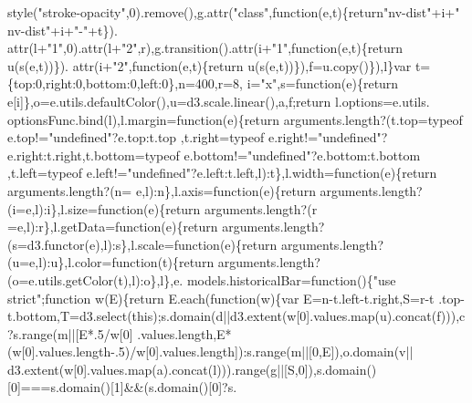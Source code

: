 \begin{DoxyCode}
      style(\textcolor{stringliteral}{"stroke-opacity"},0).remove(),g.attr(\textcolor{stringliteral}{"class"},\textcolor{keyword}{function}(e,t)\{\textcolor{keywordflow}{return}\textcolor{stringliteral}{"nv-dist"}+i+\textcolor{stringliteral}{" nv-dist"}+i+\textcolor{stringliteral}{"-"}+t\}).
      attr(l+\textcolor{stringliteral}{"1"},0).attr(l+\textcolor{stringliteral}{"2"},r),g.transition().attr(i+\textcolor{stringliteral}{"1"},\textcolor{keyword}{function}(e,t)\{\textcolor{keywordflow}{return} u(s(e,t))\}).
      attr(i+\textcolor{stringliteral}{"2"},\textcolor{keyword}{function}(e,t)\{\textcolor{keywordflow}{return} u(s(e,t))\}),f=u.copy()\}),l\}var t=\{top:0,right:0,bottom:0,left:0\},n=400,r=8,
      i=\textcolor{stringliteral}{"x"},s=\textcolor{keyword}{function}(e)\{\textcolor{keywordflow}{return} e[i]\},o=e.utils.defaultColor(),u=d3.scale.linear(),a,f;\textcolor{keywordflow}{return} l.options=e.utils.
      optionsFunc.bind(l),l.margin=\textcolor{keyword}{function}(e)\{\textcolor{keywordflow}{return} arguments.length?(t.top=typeof e.top!=\textcolor{stringliteral}{"undefined"}?e.top:t.top
      ,t.right=typeof e.right!=\textcolor{stringliteral}{"undefined"}?e.right:t.right,t.bottom=typeof e.bottom!=\textcolor{stringliteral}{"undefined"}?e.bottom:t.bottom
      ,t.left=typeof e.left!=\textcolor{stringliteral}{"undefined"}?e.left:t.left,l):t\},l.width=\textcolor{keyword}{function}(e)\{\textcolor{keywordflow}{return} arguments.length?(n=
      e,l):n\},l.axis=\textcolor{keyword}{function}(e)\{\textcolor{keywordflow}{return} arguments.length?(i=e,l):i\},l.size=\textcolor{keyword}{function}(e)\{\textcolor{keywordflow}{return} arguments.length?(r
      =e,l):r\},l.getData=\textcolor{keyword}{function}(e)\{\textcolor{keywordflow}{return} arguments.length?(s=d3.functor(e),l):s\},l.scale=\textcolor{keyword}{function}(e)\{\textcolor{keywordflow}{return} 
      arguments.length?(u=e,l):u\},l.color=\textcolor{keyword}{function}(t)\{\textcolor{keywordflow}{return} arguments.length?(o=e.utils.getColor(t),l):o\},l\},e.
      models.historicalBar=\textcolor{keyword}{function}()\{\textcolor{stringliteral}{"use strict"};\textcolor{keyword}{function} w(E)\{\textcolor{keywordflow}{return} E.each(\textcolor{keyword}{function}(w)\{var E=n-t.left-t.right,S=r-t
      .top-t.bottom,T=d3.select(\textcolor{keyword}{this});s.domain(d||d3.extent(w[0].values.map(u).concat(f))),c?s.range(m||[E*.5/w[0]
      .values.length,E*(w[0].values.length-.5)/w[0].values.length]):s.range(m||[0,E]),o.domain(v||
      d3.extent(w[0].values.map(a).concat(l))).range(g||[S,0]),s.domain()[0]===s.domain()[1]&&(s.domain()[0]?s.

\end{DoxyCode}
